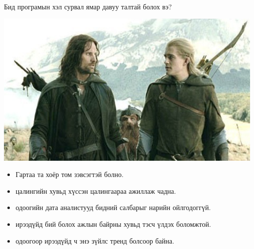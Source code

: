 \documentclass[
  ignorenonframetext,
]{beamer}
\providecommand{\tightlist}{%
  \setlength{\itemsep}{0pt}\setlength{\parskip}{0pt}}
\begin{document}
\begin{frame}{Бид програмын хэл сурвал ямар давуу талтай болох вэ?}
\protect\hypertarget{ux431ux438ux434-ux43fux440ux43eux433ux440ux430ux43cux44bux43d-ux445ux44dux43b-ux441ux443ux440ux432ux430ux43b-ux44fux43cux430ux440-ux434ux430ux432ux443ux443-ux442ux430ux43bux442ux430ux439-ux431ux43eux43bux43eux445-ux432ux44d}{}

\includegraphics[width=500px]{Picture4}

\begin{itemize}
\tightlist
\item
  Гартаа та хоёр том зэвсэгтэй болно.
\item
  цалингийн хувьд хүссэн цалингаараа ажиллаж чадна.
\item
  одоогийн дата аналистууд бидний салбарыг нарийн ойлгодоггүй.
\item
  ирээдүйд бий болох ажлын байрны хувьд тэсч үлдэх боломжтой.
\item
  одоогоор ирээдүйд ч энэ зүйлс тренд болсоор байна.
\end{itemize}

\end{frame}
\end{document}
